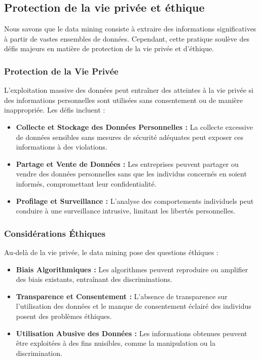 \documentclass[a4paper,12pt]{article}
\begin{document}
	\subsection{Protection de la vie privée et éthique}
		Nous savons que le data mining consiste à extraire des informations significatives à partir de vastes ensembles de données. Cependant, cette pratique soulève des défis majeurs en matière de protection de la vie privée et d'éthique.

		\subsubsection{Protection de la Vie Privée}
		L'exploitation massive des données peut entraîner des atteintes à la vie privée si des informations personnelles sont utilisées sans consentement ou de manière inappropriée. Les défis incluent :
			\begin{itemize}
				\item \textbf{Collecte et Stockage des Données Personnelles :} La collecte excessive de données sensibles sans mesures de sécurité adéquates peut exposer ces informations à des violations.
				\item \textbf{Partage et Vente de Données :} Les entreprises peuvent partager ou vendre des données personnelles sans que les individus concernés en soient informés, compromettant leur confidentialité.
				\item \textbf{Profilage et Surveillance :} L'analyse des comportements individuels peut conduire à une surveillance intrusive, limitant les libertés personnelles.
			\end{itemize}

		\subsubsection{Considérations Éthiques}
		Au-delà de la vie privée, le data mining pose des questions éthiques :
			\begin{itemize}
				\item \textbf{Biais Algorithmiques :} Les algorithmes peuvent reproduire ou amplifier des biais existants, entraînant des discriminations.
				\item \textbf{Transparence et Consentement :} L'absence de transparence sur l'utilisation des données et le manque de consentement éclairé des individus posent des problèmes éthiques.
				\item \textbf{Utilisation Abusive des Données :} Les informations obtenues peuvent être exploitées à des fins nuisibles, comme la manipulation ou la discrimination.
			\end{itemize}
			
\end{document}
